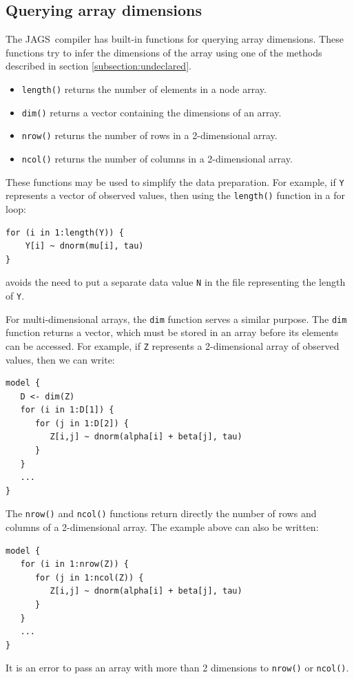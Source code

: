 \documentclass[11pt, a4paper, titlepage]{report}
\newcommand{\JAGS}{\textsf{JAGS}}
\begin{document}
\subsection{Querying array dimensions}  

The \JAGS\ compiler has built-in functions for querying array
dimensions. These functions try to infer the dimensions of the array
using one of the methods described in section
\ref{subsection:undeclared}.

\begin{itemize}
  \item \texttt{length()} returns the number of elements in
    a node array.
  \item \texttt{dim()} returns a vector
    containing the dimensions of an array.
  \item \texttt{nrow()} returns the number of rows in a 2-dimensional
    array.
  \item \texttt{ncol()} returns the number of columns in a
    2-dimensional array.
\end{itemize}

These functions may be used to simplify the data preparation. For
example, if \texttt{Y} represents a vector of observed values, then
using the \texttt{length()} function in a for loop:
\begin{verbatim}
for (i in 1:length(Y)) {
    Y[i] ~ dnorm(mu[i], tau)
}
\end{verbatim}
avoids the need to put a separate data value \verb+N+ in the file
representing the length of \verb+Y+.  

For multi-dimensional arrays, the \verb+dim+ function serves a similar
purpose. The \verb+dim+ function returns a vector, which must be
stored in an array before its elements can be accessed. For example,
if \texttt{Z} represents a 2-dimensional array of observed values, then
we can write:
\begin{verbatim}
model {
   D <- dim(Z)
   for (i in 1:D[1]) {
      for (j in 1:D[2]) {
         Z[i,j] ~ dnorm(alpha[i] + beta[j], tau)
      }
   }
   ...
}
\end{verbatim}
The \texttt{nrow()} and \texttt{ncol()} functions return directly the
number of rows and columns of a 2-dimensional array. The example above
can also be written:
\begin{verbatim}
model {
   for (i in 1:nrow(Z)) {
      for (j in 1:ncol(Z)) {
         Z[i,j] ~ dnorm(alpha[i] + beta[j], tau)
      }
   }
   ...
}
\end{verbatim}
It is an error to pass an array with more than 2 dimensions to
\texttt{nrow()} or \texttt{ncol()}.
\end{document}
